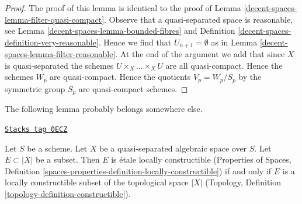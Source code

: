 \begin{proof}
The proof of this lemma is identical to the proof of
Lemma \ref{decent-spaces-lemma-filter-quasi-compact}.
Observe that a quasi-separated space is reasonable, see
Lemma \ref{decent-spaces-lemma-bounded-fibres} and
Definition \ref{decent-spaces-definition-very-reasonable}.
Hence we find that $U_{n + 1} = \emptyset$ as in
Lemma \ref{decent-spaces-lemma-filter-reasonable}.
At the end of the argument we add that since $X$ is quasi-separated
the schemes $U \times_X \ldots \times_X U$ are all quasi-compact.
Hence the schemes $W_p$ are quasi-compact. Hence the
quotients $V_p = W_p/S_p$ by the symmetric group $S_p$ are quasi-compact
schemes.
\end{proof}

The following lemma probably belongs somewhere else.

\begin{lemma}
\label{decent-spaces-lemma-locally-constructible}
\href{https://stacks.math.columbia.edu/tag/0ECZ}{\texttt{Stacks tag 0ECZ}}

Let $S$ be a scheme. Let $X$ be a quasi-separated algebraic space over $S$.
Let $E \subset |X|$ be a subset. Then $E$ is \'etale locally constructible
(Properties of Spaces, Definition
\ref{spaces-properties-definition-locally-constructible})
if and only if $E$ is a locally constructible subset of
the topological space $|X|$
(Topology, Definition \ref{topology-definition-constructible}).
\end{lemma}

